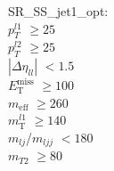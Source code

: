 SR\_SS\_jet1\_opt: \\
$p_T^{l1}$ $\geq 25$ \\
$p_T^{l2}$ $\geq 25$ \\
$|\Delta\eta_{ll}|$ $<1.5$ \\
$E_{\text{T}}^{\text{miss}}$ $\geq 100$ \\
$m_{\text{eff}}$ $\geq 260$ \\
$m_{\text{T}}^{l1}$ $\geq 140$ \\
$m_{lj}$/$m_{ljj}$ $<180$ \\
$m_{T2}$ $\geq 80$ \\
